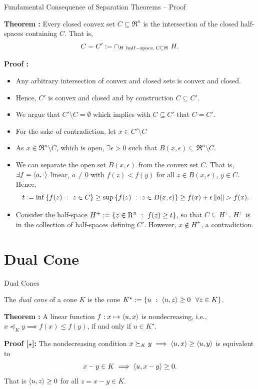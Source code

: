 \documentclass[9pt]{beamer}
\begin{document}
\begin{frame}{Fundamental Consequence of Separation Theorems -- Proof}

  \textbf{Theorem : } Every closed convex set $C \subseteq \Re^n$ is the intersection of the closed half-spaces containing $C$. That is,
  \[
    C = C':=\cap_{H~\rm{half-space},\, C\subseteq H} ~H.
  \]

  \textbf{Proof : }
  \begin{itemize}
  \item<2-> Any arbitrary intersection of convex and closed sets is convex and closed.
  \item<3-> Hence, $C'$ is convex and closed and by construction $C \subseteq C'$.
  \item<4-> We argue that $C'\setminus C = \emptyset$ which implies with $C \subseteq C'$ that $C=C'$.
  \item<5-> For the sake of contradiction, let $x \in C'\setminus C$
  \item<6-> As $x\in\Re^n\setminus C$, which is open, $\exists \epsilon>0$ such that $B(x, \epsilon) \subseteq \Re^n\setminus C$.
  \item<7-> We can separate the open set $B(x, \epsilon)$ from the convex set $C$. That is, $\exists f=\left<a, \cdot\right>$ linear, $a\neq 0$ with $f(z)<f(y)$ for all $z\in B(x, \epsilon)$, $y\in C$. Hence,
    \[
      t := \inf \left\{ f(z)\ : \ z\in C \right\} \geq \sup \left\{ f(z)\ : \ z\in B(x, \epsilon) \right\} \geq f(x) + \epsilon \left\|a\right\| > f(x).
    \]
  \item<8-> Consider the half-space $H^+:= \left\{ z\in \mathrm{R}^n\ : \ f(z)\geq t \right\}$, so that $C\subseteq H^+$. $H^+$ is in the collection of half-spaces defining $C'$. However, $x\notin H^+$, a contradiction.
  \end{itemize}
    
\end{frame}

\section{Dual Cone}

\begin{frame}{Dual Cones}

  The \emph{dual cone} of a cone $K$ is the cone $K^\star := \left\{ u\ : \ \left<u, z\right> \geq 0 ~~\forall z\in K \right\}$.
  
  \vfill

  \textbf{Theorem :} A linear function $f:x\mapsto \left<u, x\right>$ is nondecreasing, i.e., $x\preceq_{K} y \implies f(x)\leq f(y)$, if and only if
  \(
    u \in K^\star.
  \)

  \vfill
  
  \textbf{Proof [$\star$]:}
  The nondecreasing condition $x\succeq_K y \implies \left<u, x\right> \geq \left<u, y\right>$ is equivalent to
  \[
    x - y \in K \implies \left<u, x-y\right> \geq 0.
  \]
  That is $\left<u, z\right> \geq 0$ for all $z = x-y \in K$.


\end{frame}
\end{document}
